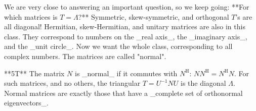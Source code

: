 We are very close to answering an important question, so we keep going: **For which matrices is \(T=\Lambda\)?** Symmetric, skew-symmetric, and orthogonal \(T\)'s are all diagonal! Hermitian, skew-Hermitian, and unitary matrices are also in this class. They correspond to numbers on the _real axis_, the _imaginary axis_, and the _unit circle_. Now we want the whole class, corresponding to all complex numbers. The matrices are called "normal".

**5T** The matrix \(N\) is _normal_ if it commutes with \(N^{\mathrm{H}}\): \(NN^{\mathrm{H}}=N^{\mathrm{H}}N\). For such matrices, and no others, the triangular \(T=U^{-1}NU\) is the diagonal \(\Lambda\). Normal matrices are exactly those that have a _complete set of orthonormal eigenvectors_.

 
